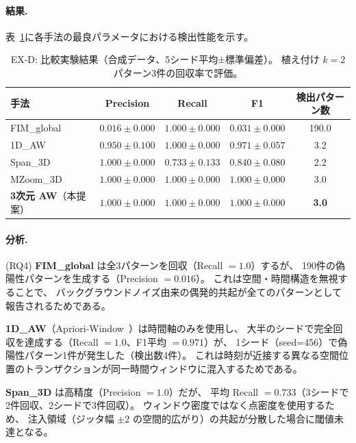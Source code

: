 \paragraph{結果.}
表~\ref{tab:ex_d}に各手法の最良パラメータにおける検出性能を示す。

\begin{table}[t]
\centering
\caption{EX-D: 比較実験結果（合成データ、5シード平均±標準偏差）。
植え付け $k=2$ パターン3件の回収率で評価。}
\label{tab:ex_d}
\small
\begin{tabular}{lcccc}
\toprule
手法 & Precision & Recall & F1 & 検出パターン数 \\
\midrule
FIM\_global  & $0.016 \pm 0.000$ & $\mathbf{1.000} \pm 0.000$ & $0.031 \pm 0.000$ & 190.0 \\
1D\_AW       & $0.950 \pm 0.100$ & $\mathbf{1.000} \pm 0.000$ & $0.971 \pm 0.057$ & 3.2   \\
Span\_3D     & $\mathbf{1.000} \pm 0.000$ & $0.733 \pm 0.133$ & $0.840 \pm 0.080$ & 2.2   \\
MZoom\_3D    & $\mathbf{1.000} \pm 0.000$ & $\mathbf{1.000} \pm 0.000$ & $\mathbf{1.000} \pm 0.000$ & 3.0 \\
\textbf{3次元 AW}（本提案） & $\mathbf{1.000} \pm 0.000$ & $\mathbf{1.000} \pm 0.000$ & $\mathbf{1.000} \pm 0.000$ & \textbf{3.0} \\
\bottomrule
\end{tabular}
\end{table}

\paragraph{分析.}
(RQ4)
\textbf{FIM\_global} は全3パターンを回収（Recall $= 1.0$）するが、
190件の偽陽性パターンを生成する（Precision $= 0.016$）。
これは空間・時間構造を無視することで、
バックグラウンドノイズ由来の偶発的共起が全てのパターンとして報告されるためである。

\textbf{1D\_AW}（Apriori-Window~\cite{aprioriwindow}）は時間軸のみを使用し、
大半のシードで完全回収を達成する（Recall $= 1.0$、F1平均 $= 0.971$）が、
1シード（seed=456）で偽陽性パターン1件が発生した（検出数4件）。
これは時刻が近接する異なる空間位置のトランザクションが同一時間ウィンドウに混入するためである。

\textbf{Span\_3D} は高精度（Precision $= 1.0$）だが、
平均 Recall $= 0.733$（3シードで2件回収、2シードで3件回収）。
ウィンドウ密度ではなく点密度を使用するため、
注入領域（ジッタ幅 $\pm 2$ の空間的広がり）の共起が分散した場合に閾値未達となる。

